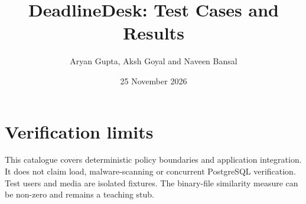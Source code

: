 \documentclass[11pt,a4paper]{article}
\title{DeadlineDesk: Test Cases and Results}
\author{Aryan Gupta, Aksh Goyal and Naveen Bansal}
\date{25 November 2026}
\begin{document}
\maketitle

\section*{Verification limits}
This catalogue covers deterministic policy boundaries and application integration. It does not claim load, malware-scanning or concurrent PostgreSQL verification. Test users and media are isolated fixtures. The binary-file similarity measure can be non-zero and remains a teaching stub.
\end{document}
